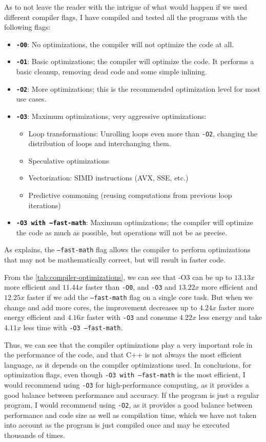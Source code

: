 As to not leave the reader with the intrigue of what would happen if we used different compiler flags, I have compiled and tested all the programs with the following flags:
\begin{itemize}
    \item \textbf{\texttt{-O0}}: No optimizations, the compiler will not optimize the code at all.
    \item \textbf{\texttt{-O1}}: Basic optimizations; the compiler will optimize the code. It performs a basic cleanup, removing dead code and some simple inlining.
    \item \textbf{\texttt{-O2}}: More optimizations; this is the recommended optimization level for most use cases.
    \item \textbf{\texttt{-O3}}: Maximum optimizations, very aggressive optimizations:
    \begin{itemize}
        \item Loop transformations: Unrolling loops even more than \texttt{-O2}, changing the distribution of loops and interchanging them.
        \item Speculative optimizations
        \item Vectorization: \gls{SIMD} instructions (AVX, SSE, etc.)
        \item Predictive commoning (reusing computations from previous loop iterations)
    \end{itemize}
    \item \textbf{\texttt{-O3 with --fast-math}}: Maximum optimizations; the compiler will optimize the code as much as possible, but operations will not be as precise.
\end{itemize}

As \autocite{llvm-fast-math} explains, the \texttt{--fast-math} flag allows the compiler to perform optimizations that may not be mathematically correct, but will result in faster code. 





From the \autoref{tab:compiler-optimizations}, we can see that -O3 can be up to $13.13x$ more efficient and $11.44x$ faster than \texttt{-O0}, and \texttt{-O3} and $13.22x$ more efficient and $12.25x$ faster if we add the \texttt{--fast-math} flag on a single core task. But when we change and add more cores, the improvement decreases up to $4.24x$ faster more energy efficient and $4.16x$ faster with \texttt{-O3} and consume $4.22x$ less energy and take $4.11x$ less time with \texttt{-O3 --fast-math}.

Thus, we can see that the compiler optimizations play a very important role in the performance of the code, and that C++ is not always the most efficient language, as it depends on the compiler optimizations used. In conclusions, for optimization flags, even though \texttt{-O3 with --fast-math} is the most efficient, I would recommend using \texttt{-O3} for high-performance computing, as it provides a good balance between performance and accuracy. If the program is just a regular program, I would recommend using \texttt{-O2}, as it provides a good balance between performance and code size as well as compilation time, which we have not taken into account as the program is just compiled once and may be executed thousands of times.